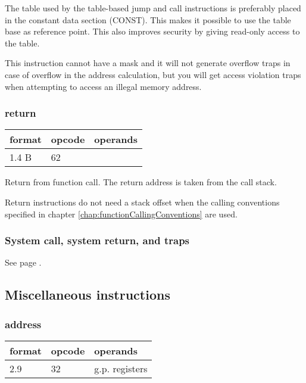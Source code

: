 \documentclass[forwardcom.tex]{subfiles}
\begin{document}
The table used by the table-based jump and call instructions is preferably placed in the constant data section (CONST). This makes it possible to use the table base as reference point. This also improves security by giving read-only access to the table.
\vspace{2mm}

This instruction cannot have a mask and it will not generate overflow traps in case of overflow in the address calculation, but you will get access violation traps when attempting to access an illegal memory address.
\vspace{2mm}

\subsubsection{return}
\label{table:returnInstruction}
\begin{tabular}{|p{12mm}|p{12mm}|p{110mm}|}
\hline
\bfseries format & \bfseries opcode & \bfseries operands \\ \hline
1.4 B & 62 & \\ \hline
\end{tabular}
\vspace{2mm}

Return from function call. The return address is taken from the call stack.
\vspace{2mm}

Return instructions do not need a stack offset when the calling conventions specified in chapter \ref{chap:functionCallingConventions} are used.


\subsubsection{System call, system return, and traps}
See page \pageref{table:sysCallInstruction}.
\vspace{2mm}


\subsection{Miscellaneous instructions}

\subsubsection{address}
\label{table:addressInstruction}
\begin{tabular}{|p{12mm}|p{12mm}|p{110mm}|}
\hline
\bfseries format & \bfseries opcode & \bfseries operands \\ \hline
2.9 & 32 & g.p. registers \\ \hline
\end{tabular}
\vspace{2mm}
\end{document}
